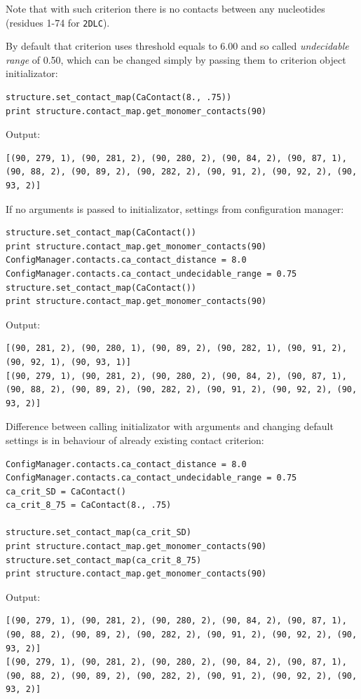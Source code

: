 \documentclass{article}
\begin{document}
Note that with such criterion there is no contacts between any nucleotides (residues 1-74 for \texttt{2DLC}).

By default that criterion uses threshold equals to 6.00 and so called \textit{undecidable range} of 0.50, which can be changed simply by passing them to criterion object initializator:

\begin{lstlisting}
structure.set_contact_map(CaContact(8., .75))
print structure.contact_map.get_monomer_contacts(90)
\end{lstlisting}
Output:
\begin{lstlisting}
[(90, 279, 1), (90, 281, 2), (90, 280, 2), (90, 84, 2), (90, 87, 1), (90, 88, 2), (90, 89, 2), (90, 282, 2), (90, 91, 2), (90, 92, 2), (90, 93, 2)]
\end{lstlisting}

If no arguments is passed to initializator, settings from configuration manager:

\begin{lstlisting}
structure.set_contact_map(CaContact())
print structure.contact_map.get_monomer_contacts(90)
ConfigManager.contacts.ca_contact_distance = 8.0
ConfigManager.contacts.ca_contact_undecidable_range = 0.75
structure.set_contact_map(CaContact())
print structure.contact_map.get_monomer_contacts(90)
\end{lstlisting}
Output:
\begin{lstlisting}
[(90, 281, 2), (90, 280, 1), (90, 89, 2), (90, 282, 1), (90, 91, 2), (90, 92, 1), (90, 93, 1)]
[(90, 279, 1), (90, 281, 2), (90, 280, 2), (90, 84, 2), (90, 87, 1), (90, 88, 2), (90, 89, 2), (90, 282, 2), (90, 91, 2), (90, 92, 2), (90, 93, 2)]
\end{lstlisting}

Difference between calling initializator with arguments and changing default settings is in behaviour of already existing contact criterion:

\begin{lstlisting}
ConfigManager.contacts.ca_contact_distance = 8.0
ConfigManager.contacts.ca_contact_undecidable_range = 0.75
ca_crit_SD = CaContact()
ca_crit_8_75 = CaContact(8., .75)

structure.set_contact_map(ca_crit_SD)
print structure.contact_map.get_monomer_contacts(90)
structure.set_contact_map(ca_crit_8_75)
print structure.contact_map.get_monomer_contacts(90)
\end{lstlisting}
Output:
\begin{lstlisting}
[(90, 279, 1), (90, 281, 2), (90, 280, 2), (90, 84, 2), (90, 87, 1), (90, 88, 2), (90, 89, 2), (90, 282, 2), (90, 91, 2), (90, 92, 2), (90, 93, 2)]
[(90, 279, 1), (90, 281, 2), (90, 280, 2), (90, 84, 2), (90, 87, 1), (90, 88, 2), (90, 89, 2), (90, 282, 2), (90, 91, 2), (90, 92, 2), (90, 93, 2)]
\end{lstlisting}
\end{document}
